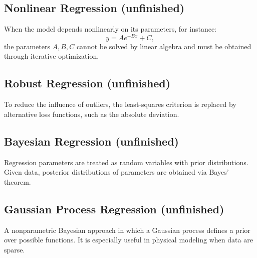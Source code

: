 \documentclass[../../../main.tex]{subfiles}
\begin{document}
\subsection{Nonlinear Regression (unfinished)}
When the model depends nonlinearly on its parameters, for instance:
\begin{equation*}
    y = A e^{-Bx} + C,
\end{equation*}
the parameters \( A, B, C \) cannot be solved by linear algebra and must be obtained through iterative optimization.

\subsection{Robust Regression (unfinished)}
To reduce the influence of outliers, the least-squares criterion is replaced by alternative loss functions, such as the absolute deviation.

\subsection{Bayesian Regression (unfinished)}
Regression parameters are treated as random variables with prior distributions.  
Given data, posterior distributions of parameters are obtained via Bayes' theorem.

\subsection{Gaussian Process Regression (unfinished)}
A nonparametric Bayesian approach in which a Gaussian process defines a prior over possible functions.  
It is especially useful in physical modeling when data are sparse.
\end{document}
